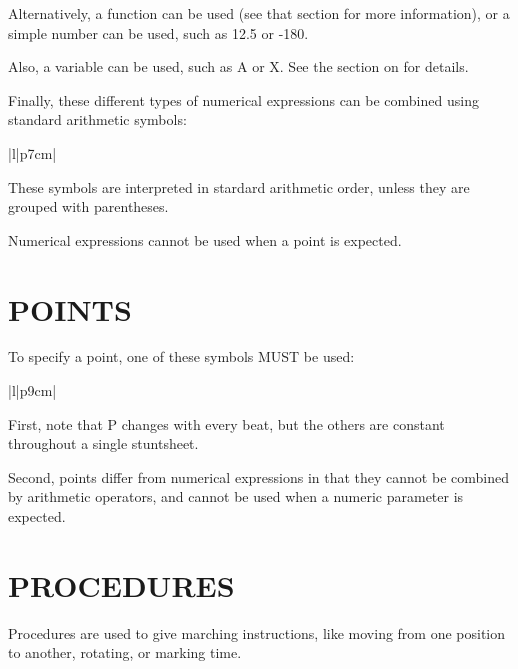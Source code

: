 Alternatively, a function can be used (see that section for more
information), or a simple number can be used, such as 12.5 or -180.

Also, a variable can be used, such as A or X.  See the section on
 for details.

Finally, these different types of numerical expressions can be combined
using standard arithmetic symbols:

\begin{tabular}{|l|p{7cm}|}\hline
{}
\end{tabular}

These symbols are interpreted in stardard arithmetic order, unless they are
grouped with parentheses.

Numerical expressions cannot be used when a point is expected.

\section{POINTS}\label{points}

To specify a point, one of these symbols MUST be used:

\begin{tabular}{|l|p{9cm}|}\hline
{}\hline\hline
{}
\end{tabular}

First, note that P changes with every beat, but the others are constant
throughout a single stuntsheet.

Second, points differ from numerical expressions in that they cannot be
combined by arithmetic operators, and cannot be used when a numeric
parameter is expected.

\section{PROCEDURES}\label{procedures}

Procedures are used to give marching instructions, like moving from one
position to another, rotating, or marking time.

